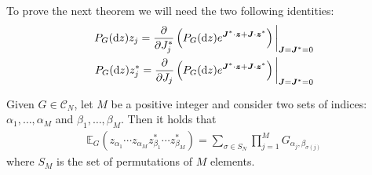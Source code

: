 To prove the next theorem we will need the two following identities:
\begin{align}
	\label{eq:source-terms}
	P_G(\mathrm{d} z)z_j = \frac{\partial}{\partial J^*_j}\left(P_G(\mathrm{d} z)e^{\boldsymbol{J}^*\cdot\boldsymbol{z}+\boldsymbol{J}\cdot\boldsymbol{z}^*}\right)
	\bigg|_{\boldsymbol{J}=\boldsymbol{J}^*=0}\nonumber\\
	P_G(\mathrm{d} z)z^*_j = \frac{\partial}{\partial J_j}\left(P_G(\mathrm{d} z)e^{\boldsymbol{J}^*\cdot\boldsymbol{z}+\boldsymbol{J}\cdot\boldsymbol{z}^*}\right)
	\bigg|_{\boldsymbol{J}=\boldsymbol{J}^*=0}
\end{align}

\begin{theorem}
	\label{thm:isserlis}
	Given $G\in\mathcal{C}_N$, let $M$ be a positive integer and consider two sets of indices:
	$\alpha_1,\ldots,\alpha_M$ and $\beta_1,\ldots,\beta_M$. Then it holds that
	\begin{align*}
		\mathbb{E}_G(z_{\alpha_1}\cdots z_{\alpha_M} z^*_{\beta_1}\cdots z^*_{\beta_M})
		= \sum_{\sigma\in S_N} \prod_{j=1}^M G_{\alpha_j,\beta_{\sigma(j)}}
	\end{align*}
	where $S_M$ is the set of permutations of $M$ elements.
\end{theorem}
